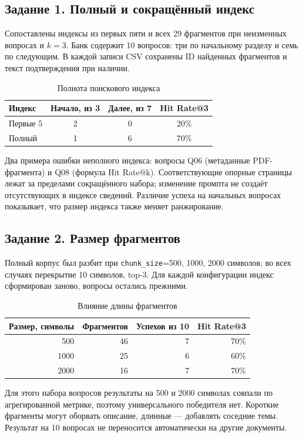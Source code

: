 \documentclass[12pt,a4paper]{article}
\begin{document}
\subsection{Задание 1. Полный и сокращённый индекс}
Сопоставлены индексы из первых пяти и всех 29 фрагментов при неизменных вопросах и $k=3$. Банк содержит 10 вопросов: три по начальному разделу и семь по следующим. В каждой записи CSV сохранены ID найденных фрагментов и текст подтверждения при наличии.
\begin{table}[H]\centering\caption{Полнота поискового индекса}\begin{tabular}{|l|c|c|c|}\hline
Индекс & Начало, из 3 & Далее, из 7 & Hit Rate@3 \\ \hline
Первые 5 & 2 & 0 & 20\% \\ \hline
Полный & 1 & 6 & 70\% \\ \hline
\end{tabular}\end{table}
Два примера ошибки неполного индекса: вопросы Q06 (метаданные PDF-фрагмента) и Q08 (формула Hit Rate@k). Соответствующие опорные страницы лежат за пределами сокращённого набора; изменение промпта не создаёт отсутствующих в индексе сведений. Различие успеха на начальных вопросах показывает, что размер индекса также меняет ранжирование.

\subsection{Задание 2. Размер фрагментов}
Полный корпус был разбит при \texttt{chunk\_size}=500, 1000, 2000 символов; во всех случаях перекрытие 10 символов, top-3. Для каждой конфигурации индекс сформирован заново, вопросы остались прежними.
\begin{table}[H]\centering\caption{Влияние длины фрагментов}\begin{tabular}{|r|r|r|r|}\hline
Размер, символы & Фрагментов & Успехов из 10 & Hit Rate@3 \\ \hline
500 & 46 & 7 & 70\% \\ \hline
1000 & 25 & 6 & 60\% \\ \hline
2000 & 16 & 7 & 70\% \\ \hline
\end{tabular}\end{table}
Для этого набора вопросов результаты на 500 и 2000 символах совпали по агрегированной метрике, поэтому универсального победителя нет. Короткие фрагменты могут оборвать описание, длинные --- добавлять соседние темы. Результат на 10 вопросах не переносится автоматически на другие документы.
\end{document}
